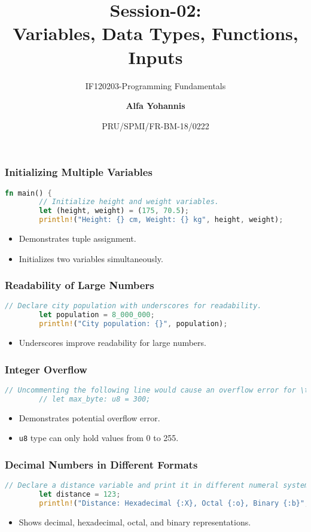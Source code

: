 \documentclass[aspectratio=169, table]{beamer}
\subtitle{IF120203-Programming Fundamentals}
\title{Session-02:\\\LARGE{
Variables, Data Types, Functions,\\
Inputs}}
\date[Serial]{\scriptsize {PRU/SPMI/FR-BM-18/0222}}
\author[Pradita]{\small{\textbf{Alfa Yohannis}}}
\begin{document}
\frame{\titlepage}

\begin{frame}[fragile]
\frametitle{Initializing Multiple Variables}
\begin{lstlisting}[language=Rust]
	fn main() {
		// Initialize height and weight variables.
		let (height, weight) = (175, 70.5);
		println!("Height: {} cm, Weight: {} kg", height, weight);
	\end{lstlisting}
	\begin{itemize}
		\item Demonstrates tuple assignment.
		\item Initializes two variables simultaneously.
	\end{itemize}
\end{frame}

\begin{frame}[fragile]
	\frametitle{Readability of Large Numbers}
	\begin{lstlisting}[language=Rust]
		// Declare city population with underscores for readability.
		let population = 8_000_000;
		println!("City population: {}", population);
	\end{lstlisting}
	\begin{itemize}
		\item Underscores improve readability for large numbers.
	\end{itemize}
\end{frame}

\begin{frame}[fragile]
	\frametitle{Integer Overflow}
	\begin{lstlisting}[language=Rust]
		// Uncommenting the following line would cause an overflow error for \texttt{u8}.
		// let max_byte: u8 = 300;
	\end{lstlisting}
	\begin{itemize}
		\item Demonstrates potential overflow error.
		\item \texttt{u8} type can only hold values from 0 to 255.
	\end{itemize}
\end{frame}

\begin{frame}[fragile]
	\frametitle{Decimal Numbers in Different Formats}
	\begin{lstlisting}[language=Rust]
		// Declare a distance variable and print it in different numeral systems.
		let distance = 123;
		println!("Distance: Hexadecimal {:X}, Octal {:o}, Binary {:b}", distance, distance, distance);
	\end{lstlisting}
	\begin{itemize}
		\item Shows decimal, hexadecimal, octal, and binary representations.
	\end{itemize}
\end{frame}
\end{document}
